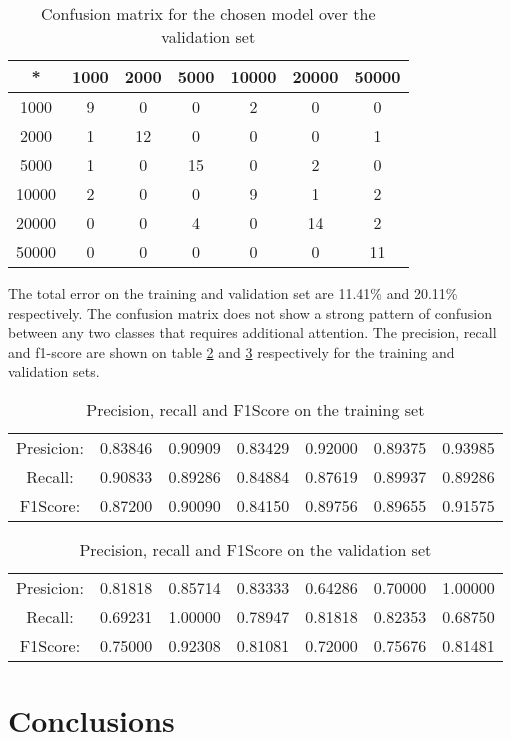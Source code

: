 \documentclass{article}
\begin{document}
\begin{table}
\centering
\begin{tabular}{|c|c|c|c|c|c|c|}
\hline
* & 1000 & 2000 & 5000 & 10000 & 20000 & 50000 \\
\hline
1000 &  9 &  0 &  0 &  2 &  0 &  0 \\
2000 &  1 & 12 &  0 &  0 &  0 &  1 \\
5000 &  1 &  0 & 15 &  0 &  2 &  0 \\
10000 &  2 &  0 &  0 &  9 &  1 &  2 \\
20000 &  0 &  0 &  4 &  0 & 14 &  2 \\
50000 &  0 &  0 &  0 &  0 &  0 & 11 \\
\hline
\end{tabular}
\caption{Confusion matrix for the chosen model over the validation set}
\label{tb:vconfm}
\end{table}

The total error on the training and validation set are 11.41\% and 20.11\% respectively. The confusion matrix
does not show a strong pattern of confusion between any two classes that requires additional attention.
The precision, recall and f1-score are shown on table \ref{tb:tscores} and \ref{tb:vscores} respectively
for the training and validation sets.

\begin{table}
\centering
\begin{tabular}{|c|c|c|c|c|c|c|}
\hline
Presicion: &  0.83846 & 0.90909 & 0.83429 & 0.92000 & 0.89375 & 0.93985 \\
Recall: &  0.90833 & 0.89286 & 0.84884 & 0.87619 & 0.89937 & 0.89286 \\
F1Score: & 0.87200 & 0.90090 & 0.84150 & 0.89756 & 0.89655 & 0.91575  \\
\hline
\end{tabular}
\caption{Precision, recall and F1Score on the training set}
\label{tb:tscores}
\end{table}

\begin{table}
\centering
\begin{tabular}{|c|c|c|c|c|c|c|}
\hline
Presicion:& 0.81818 & 0.85714 & 0.83333 & 0.64286 & 0.70000 & 1.00000 \\
Recall: & 0.69231 & 1.00000 & 0.78947 & 0.81818 & 0.82353 & 0.68750 \\
F1Score:  & 0.75000 & 0.92308 & 0.81081 & 0.72000 & 0.75676 & 0.81481  \\
\hline
\end{tabular}
\caption{Precision, recall and F1Score on the validation set}
\label{tb:vscores}
\end{table}

\section{Conclusions}
\end{document}
